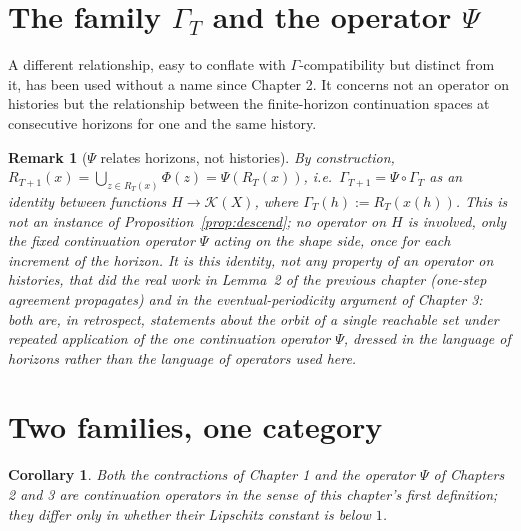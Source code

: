 \documentclass[11pt]{report}
\newtheorem{remark}{Remark}[chapter]
\newtheorem{corollary}{Corollary}[chapter]
\begin{document}
\section*{The family $\Gamma_T$ and the operator $\Psi$}

A different relationship, easy to conflate with $\Gamma$-compatibility
but distinct from it, has been used without a name since Chapter 2. It
concerns not an operator on histories but the relationship between the
finite-horizon continuation spaces at consecutive horizons for one and
the same history.

\begin{remark}[$\Psi$ relates horizons, not histories]
By construction, $R_{T+1}(x) = \bigcup_{z \in R_T(x)} \Phi(z) =
\Psi(R_T(x))$, i.e.\ $\Gamma_{T+1} = \Psi \circ \Gamma_T$ as an
identity between functions $H \to \mathcal{K}(X)$, where
$\Gamma_T(h) := R_T(x(h))$. This is not an instance of
Proposition~\ref{prop:descend}; no operator on $H$ is involved, only
the fixed continuation operator $\Psi$ acting on the shape side, once
for each increment of the horizon. It is this identity, not any
property of an operator on histories, that did the real work in
Lemma~2 of the previous chapter (one-step agreement propagates) and in
the eventual-periodicity argument of Chapter 3: both are, in
retrospect, statements about the orbit of a single reachable set
under repeated application of the one continuation operator $\Psi$,
dressed in the language of horizons rather than the language of
operators used here.
\end{remark}

\section*{Two families, one category}

\begin{corollary}
Both the contractions of Chapter 1 and the operator $\Psi$ of Chapters
2 and 3 are continuation operators in the sense of this chapter's
first definition; they differ only in whether their Lipschitz
constant is below $1$.
\end{corollary}
\end{document}
